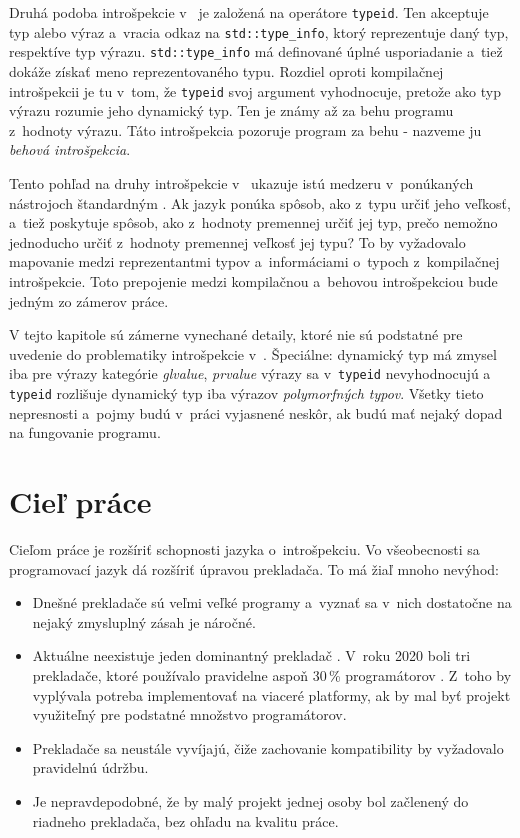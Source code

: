 Druhá podoba introšpekcie v~\Cpp{} je založená na operátore \texttt{typeid}. Ten akceptuje typ alebo výraz a~vracia odkaz na \texttt{std::type\_info}, ktorý reprezentuje daný typ, respektíve typ výrazu. \texttt{std::type\_info} má definované úplné usporiadanie a~tiež dokáže získať meno reprezentovaného typu. Rozdiel oproti kompilačnej introšpekcii je tu v~tom, že \texttt{typeid} svoj argument vyhodnocuje, pretože ako typ výrazu ro\-zu\-mie jeho dynamický typ. Ten je známy až za behu programu z~hodnoty výrazu. Táto introšpekcia pozoruje program za behu - nazveme ju \emph{behová introšpekcia}.

Tento pohľad na druhy introšpekcie v~\Cpp{} ukazuje istú medzeru v~ponúkaných nástrojoch štandardným \Cpp{}. Ak jazyk ponúka spôsob, ako z~typu určiť jeho veľkosť, a~tiež poskytuje spôsob, ako z~hodnoty premennej určiť jej  typ, prečo nemožno jednoducho určiť z~hodnoty premennej veľkosť jej  typu? To by vyžadovalo mapovanie medzi reprezentantmi typov a~informáciami o~typoch z~kompilačnej introšpekcie. Toto prepojenie medzi kompilačnou a~behovou intro\-špek\-ciou bude jedným zo zámerov práce.

V tejto kapitole sú zámerne vynechané detaily, ktoré nie sú podstatné pre uvedenie do problematiky introšpekcie v~\Cpp{}. Špeciálne: dynamický typ má zmysel iba pre výrazy kategórie \emph{glvalue}, \emph{prvalue} výrazy sa v~\texttt{typeid} nevyhodnocujú a~ \texttt{typeid} rozlišuje dynamický typ iba výrazov \emph{polymorfných typov}. Všetky tieto nepresnosti a~pojmy budú v~práci vyjasnené neskôr, ak budú mať nejaký dopad na fungovanie programu.

\section{Cieľ práce}

Cieľom práce je rozšíriť schopnosti jazyka \Cpp{} o~introšpekciu. Vo všeobecnosti sa programovací jazyk dá rozšíriť úpravou prekladača. To má žiaľ mnoho nevýhod:

\begin{itemize}
    \item Dnešné prekladače sú veľmi veľké programy a~vyznať sa v~nich dostatočne na nejaký zmysluplný zásah je náročné.
    \item Aktuálne neexistuje jeden dominantný prekladač \Cpp{}. V~roku 2020 boli tri prekladače, ktoré používalo pravidelne aspoň 30\,\% programátorov \Cpp{} \citep{jetbrains}. Z~toho by vyplývala potreba implementovať na viaceré platformy, ak by mal byť projekt využiteľný pre podstatné množstvo pro\-gramátorov.
    \item Prekladače sa neustále vyvíjajú, čiže zachovanie kompatibility by vyžadovalo pravidelnú údržbu.
    \item Je nepravdepodobné, že by malý projekt jednej osoby bol začlenený do riadneho prekladača, bez ohľadu na kvalitu práce.
\end{itemize}

